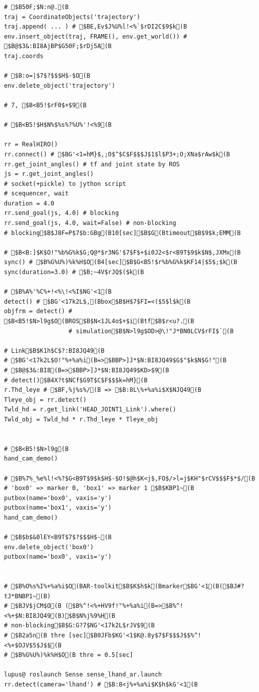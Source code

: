 \documentclass[11pt]{jarticle}
\begin{document}
{{{\begin{verbatim}
# $B50F;$N:n@.(B
traj = CoordinateObjects('trajectory')
traj.append( ... ) # $BE,Ev$J%U%l!<%`$rDI2C$9$k(B
env.insert_object(traj, FRAME(), env.get_world()) # $B@$3&:BI8AjBP$G50F;$rDj5A(B
traj.coords

# $B:o=|$7$?$$$H$-$O(B
env.delete_object('trajectory')

# 7, $B<B5!$rF0$+$9(B

# $B<B5!$H$N%$%s%?%U%'!<%9(B

rr = RealHIRO()
rr.connect() # $BG'<1=hM}$,;O$^$C$F$$$J$1$l$P3+;O;XNa$rAw$k(B
rr.get_joint_angles() # tf and joint state by ROS
js = r.get_joint_angles()
# socket(+pickle) to jython script
# scequencer, wait
duration = 4.0
rr.send_goal(js, 4.0) # blocking
rr.send_goal(js, 4.0, wait=False) # non-blocking
# blocking$B$J8F=P$7$b:GBg(B10[sec]$B$G(Btimeout$B$9$k;EMM(B

# $B<B:]$K$O!"%b%G%k$G;Q@*$r3NG'$7$F$+$i0J2<$r<B9T$9$k$N$,JXMx(B
sync() # $B%G%U%)%k%H$O(B4[sec]$B$G<B5!$r%b%G%k$KF14|$5$;$k(B
sync(duration=3.0) # $B;~4V$rJQ$($k(B

# $B%A%'%C%+!<%\!<%I$NG'<1(B
detect() # $BG'<17k2L$,(Bbox$B$H$7$FI=<($5$l$k(B
objfrm = detect() # $B<B5!$N>l9g$O(BROS$B$N<1JL4o$+$i(Btf$B$r<u?.(B
                  # simulation$B$N>l9g$OD>@\!"J*BN0LCV$rFI$`(B

# Link$B$K1h$C$?:BI8JQ49(B
# $BG'<17k2L$O!"%+%a%i(B=>$BBP>]J*$N:BI8JQ49$G$"$k$N$G!"(B
# $B@$3&:BI8(B=>$BBP>]J*$N:BI8JQ49$KD>$9(B
# detect()$B4X?t$NCf$G9T$C$F$$$k=hM}(B
r.Thd_leye # $BF,%j%s%/(B => $B:8L\%+%a%i$X$NJQ49(B
Tleye_obj = rr.detect()
Twld_hd = r.get_link('HEAD_JOINT1_Link').where()
Twld_obj = Twld_hd * r.Thd_leye * Tleye_obj


# $B<B5!$N>l9g(B
hand_cam_demo()

# $B%7%_%e%l!<%?$G<B9T$9$k$H$-$O!$@h$K<j$,FO$/>l=j$KH"$rCV$$$F$*$/(B
# 'box0' => marker 0, 'box1' => marker 1 $B$KBP1~(B
putbox(name='box0', vaxis='y')
putbox(name='box1', vaxis='y')
hand_cam_demo()

# $B$b$&0lEY<B9T$7$?$$$H$-(B
env.delete_object('box0')
putbox(name='box0', vaxis='y')


# $B%O%s%I%+%a%i$O(BAR-toolkit$B$K$h$k(Bmarker$BG'<1(B($BJ#?tJ*BNBP1~(B)
# $BJV$jCM$O(B ($B%^!<%+HV9f!"%+%a%i(B=>$B%^!<%+$N:BI8JQ49(B)$B$N%j%9%H(B
# non-blocking$B$G:G?7$NG'<17k2L$rJV$9(B
# $B2a5n(B thre [sec]$B0JFb$KG'<1$K@.8y$7$F$$$J$$%^!<%+$OJV$5$J$$(B
# $B%G%U%)%k%H$O(B thre = 0.5[sec]

lupus@ roslaunch Sense sense_lhand_ar.launch
rr.detect(camera='lhand') # $B:8<j%+%a%i$K$h$kG'<1(B


\end{verbatim}}}}
\end{document}
